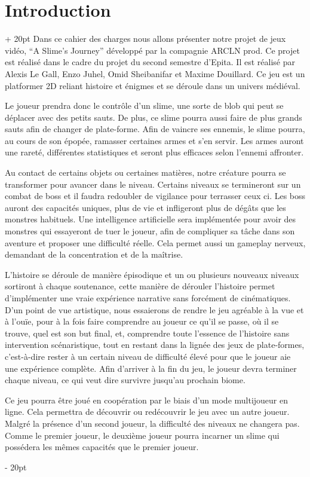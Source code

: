 \documentclass[a4paper, 12pt, twoside]{article}
\newcommand{\ind}[1][20pt]{\advance\leftskip + #1}
\newcommand{\deind}[1][20pt]{\advance\leftskip - #1}
\newenvironment{indt}[2][20pt]{#2 \par \ind[#1]}{\par \deind} %
\begin{document}
    

    \tableofcontents
    \newpage

    \begin{indt}{\section{Introduction}}
        Dans ce cahier des charges nous allons présenter notre projet de jeux vidéo, “A Slime's Journey” développé par la compagnie ARCLN prod. Ce projet est réalisé dans le cadre du projet du second semestre d'Epita. Il est réalisé par Alexis Le Gall, Enzo Juhel, Omid Sheibanifar et Maxime Douillard. Ce jeu est un platformer 2D reliant histoire et énigmes et se déroule dans un univers médiéval.

        Le joueur prendra donc le contrôle d'un slime, une sorte de blob qui peut se déplacer avec des petits sauts. De plus, ce slime pourra aussi faire de plus grands sauts afin de changer de plate-forme. Afin de vaincre ses ennemis, le slime pourra, au cours de son épopée, ramasser certaines armes et s'en servir. Les armes auront une rareté, différentes statistiques et seront plus efficaces selon l'ennemi affronter.

        Au contact de certains objets ou certaines matières, notre créature pourra se transformer pour avancer dans le niveau. Certains niveaux se termineront sur un combat de boss et il faudra redoubler de vigilance pour terrasser ceux ci. Les boss auront des capacités uniques, plus de vie et infligeront plus de dégâts que les monstres habituels. Une intelligence artificielle sera implémentée pour avoir des monstres qui essayeront de tuer le joueur, afin de  compliquer sa tâche dans son aventure et proposer une difficulté réelle. Cela permet aussi un gameplay nerveux, demandant de la concentration et de la maîtrise.

        L'histoire se déroule de manière épisodique et un ou plusieurs nouveaux niveaux sortiront à chaque soutenance, cette manière de dérouler l'histoire permet d'implémenter une vraie expérience narrative sans forcément de cinématiques. D'un point de vue artistique, nous essaierons de rendre le jeu agréable à la vue et à l'ouïe, pour à la fois faire comprendre au joueur ce qu'il se passe, où il se trouve, quel est son but final, et, comprendre toute l'essence de l'histoire sans intervention scénaristique, tout en restant dans la lignée des jeux de plate-formes, c'est-à-dire rester à un certain niveau de difficulté élevé pour que le joueur aie une expérience complète. Afin d'arriver à la fin du jeu, le joueur devra terminer chaque niveau, ce qui veut dire survivre jusqu'au prochain biome.

        Ce jeu pourra être joué en coopération par le biais d'un mode multijoueur en ligne. Cela permettra de découvrir ou redécouvrir le jeu avec un autre joueur. Malgré la présence d'un second joueur, la difficulté des niveaux ne changera pas. Comme le premier joueur, le deuxième joueur pourra incarner un slime qui possédera les mêmes capacités que le premier joueur.

    \end{indt}
\end{document}
